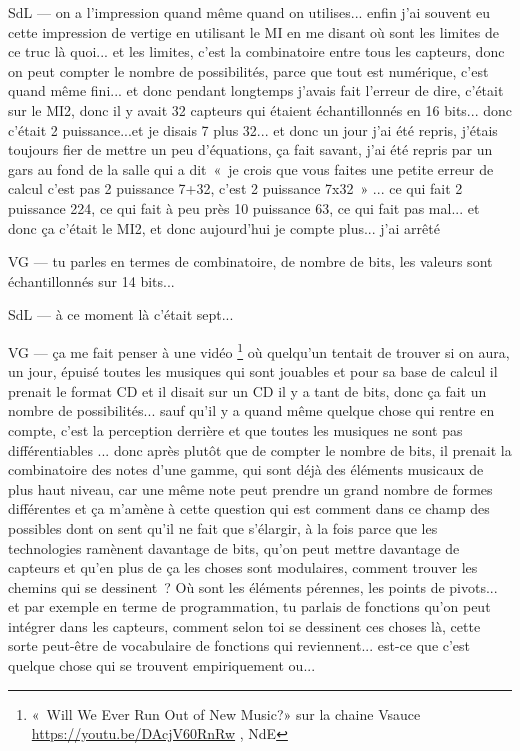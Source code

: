 SdL — on a l'impression quand même quand on utilises... enfin j'ai souvent eu cette impression de vertige en utilisant le MI en me disant où sont les limites de ce truc là quoi... et les limites, c'est la combinatoire entre tous les capteurs, donc on peut compter le nombre de possibilités, parce que tout est numérique, c'est quand même fini... et donc pendant longtemps j'avais fait l'erreur de dire, c'était sur le MI2, donc il y avait 32 capteurs qui étaient échantillonnés en 16 bits... donc c'était 2 puissance...et je disais 7 plus 32... et donc un jour j'ai été repris, j'étais toujours fier de mettre un peu d'équations, ça fait savant, j'ai été repris par un gars au fond de la salle qui a dit « je crois que vous faites une petite erreur de calcul c'est pas 2 puissance 7+32, c'est 2 puissance 7x32 » ... ce qui fait 2 puissance 224, ce qui fait à peu près 10 puissance 63, ce qui fait pas mal... et donc ça c'était le MI2, et donc aujourd'hui je compte plus... j'ai arrêté 

VG — tu parles en termes de combinatoire, de nombre de bits, les valeurs sont échantillonnés sur 14 bits... 

SdL — à ce moment là c'était sept... 

VG — ça me fait penser à une vidéo \footnote{« Will We Ever Run Out of New Music?» sur la chaine Vsauce \url{https://youtu.be/DAcjV60RnRw} , NdE} où quelqu'un tentait de trouver si on aura, un jour, épuisé toutes les musiques qui sont jouables et pour sa base de calcul il prenait le format CD et il disait sur un CD il y a tant de bits, donc ça fait un nombre de possibilités... sauf qu'il y a quand même quelque chose qui rentre en compte, c'est la perception derrière et que toutes les musiques ne sont pas différentiables ... donc après plutôt que de compter le nombre de bits, il prenait la combinatoire des notes d'une gamme, qui sont déjà des éléments musicaux de plus haut niveau, car une même note peut prendre un grand nombre de formes différentes et ça m'amène à cette question qui est comment dans ce champ des possibles dont on sent qu'il ne fait que s'élargir, à la fois parce que les technologies ramènent davantage de bits, qu'on peut mettre davantage de capteurs et qu'en plus de ça les choses sont modulaires, comment trouver les chemins qui se dessinent ? Où sont les éléments pérennes, les points de pivots... et par exemple en terme de programmation, tu parlais de fonctions qu'on peut intégrer dans les capteurs, comment selon toi se dessinent ces choses là, cette sorte peut-être de vocabulaire de fonctions qui reviennent... est-ce que c'est quelque chose qui se trouvent empiriquement ou...  

